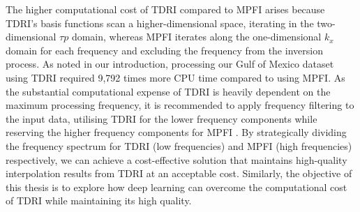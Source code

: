 The higher computational cost of TDRI compared to MPFI arises because TDRI's basis functions scan a higher-dimensional space, iterating in the two-dimensional $\tau p$ domain, whereas MPFI iterates along the one-dimensional $k_x$ domain for each frequency and excluding the frequency from the inversion process. As noted in our introduction, processing our Gulf of Mexico dataset using TDRI required 9,792 times more CPU time compared to using MPFI. As the substantial computational expense of TDRI is heavily dependent on the maximum processing frequency, it is recommended to apply frequency filtering to the input data, utilising TDRI for the lower frequency components while reserving the higher frequency components for MPFI \cite{schlumberger2016}. By strategically dividing the frequency spectrum for TDRI (low frequencies) and MPFI (high frequencies) respectively, we can achieve a cost-effective solution that maintains high-quality interpolation results from TDRI at an acceptable cost. Similarly, the objective of this thesis is to explore how deep learning can overcome the computational cost of TDRI while maintaining its high quality.





%
%
%
